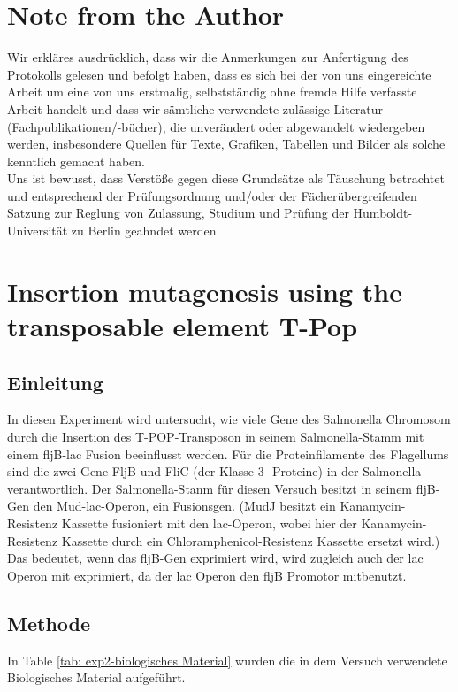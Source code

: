 \documentclass[oneside,10pt,a4paper]{report}
\begin{document}
	\chapter{Note from the Author}
	Wir erkläres ausdrücklich, dass wir die Anmerkungen zur Anfertigung des Protokolls gelesen und befolgt haben, dass es sich bei der von uns eingereichte Arbeit um eine von uns erstmalig, selbstständig ohne fremde Hilfe verfasste Arbeit handelt und dass wir sämtliche verwendete zulässige Literatur (Fachpublikationen/-bücher), die unverändert oder abgewandelt wiedergeben werden, insbesondere Quellen für Texte, Grafiken, Tabellen und Bilder als solche kenntlich gemacht haben.\\
	Uns ist bewusst, dass Verstöße gegen diese Grundsätze als Täuschung betrachtet und entsprechend der Prüfungsordnung und/oder der Fächerübergreifenden Satzung zur Reglung von Zulassung, Studium und Prüfung der Humboldt-Universität zu Berlin geahndet werden.
	
	
	\chapter{Insertion mutagenesis using the transposable element T-Pop}	
	
		\section{Einleitung}
		In diesen Experiment wird untersucht, wie viele Gene des Salmonella Chromosom durch die Insertion des T-POP-Transposon in seinem Salmonella-Stamm mit einem fljB-lac Fusion beeinflusst werden.
		Für die Proteinfilamente des Flagellums sind die zwei Gene FljB und FliC (der Klasse 3- Proteine) in der Salmonella verantwortlich\cite{Flagellum}. Der Salmonella-Stanm für diesen Versuch besitzt in seinem fljB-Gen den Mud-lac-Operon, ein Fusionsgen. (MudJ besitzt ein Kanamycin-Resistenz Kassette fusioniert mit den lac-Operon, wobei hier der Kanamycin-Resistenz Kassette durch ein Chloramphenicol-Resistenz Kassette ersetzt wird.)
		Das bedeutet, wenn das fljB-Gen exprimiert wird, wird zugleich auch der lac Operon mit exprimiert, da der lac Operon den fljB Promotor mitbenutzt.
		
		
		\section{Methode}
		In Table \ref{tab: exp2-biologisches Material} wurden die in dem Versuch verwendete Biologisches Material aufgeführt.
		
\end{document}
